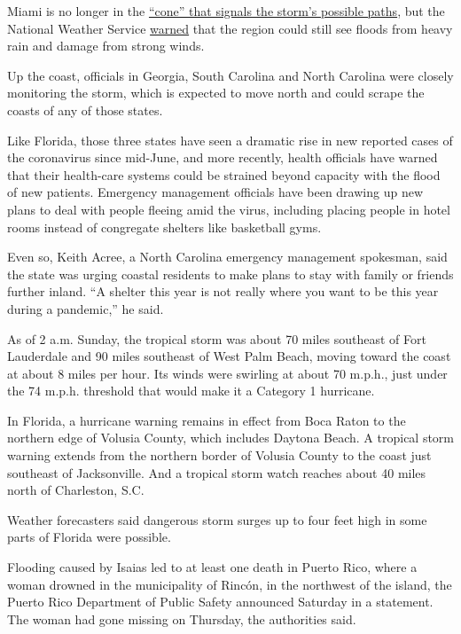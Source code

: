 Miami is no longer in the
\href{https://www.nytimes.com/2018/09/11/climate/hurricane-evacuation-path-forecasts.html}{``cone''
that signals the storm's possible paths}, but the National Weather
Service
\href{https://forecast.weather.gov/showsigwx.php?warnzone=FLZ073\&warncounty=FLC086\&firewxzone=FLZ073\&local_place1=3\%20Miles\%20W\%20Palm\%20Springs\%20North\%20FL\&product1=Hurricane+Local+Statement\&lat=25.9366\&lon=-80.3793\#.XyWaz_hKjOQ}{warned}
that the region could still see floods from heavy rain and damage from
strong winds.

Up the coast, officials in Georgia, South Carolina and North Carolina
were closely monitoring the storm, which is expected to move north and
could scrape the coasts of any of those states.

Like Florida, those three states have seen a dramatic rise in new
reported cases of the coronavirus since mid-June, and more recently,
health officials have warned that their health-care systems could be
strained beyond capacity with the flood of new patients. Emergency
management officials have been drawing up new plans to deal with people
fleeing amid the virus, including placing people in hotel rooms instead
of congregate shelters like basketball gyms.

Even so, Keith Acree, a North Carolina emergency management spokesman,
said the state was urging coastal residents to make plans to stay with
family or friends further inland. ``A shelter this year is not really
where you want to be this year during a pandemic,'' he said.

As of 2 a.m. Sunday, the tropical storm was about 70 miles southeast of
Fort Lauderdale and 90 miles southeast of West Palm Beach, moving toward
the coast at about 8 miles per hour. Its winds were swirling at about 70
m.p.h., just under the 74 m.p.h. threshold that would make it a Category
1 hurricane.

In Florida, a hurricane warning remains in effect from Boca Raton to the
northern edge of Volusia County, which includes Daytona Beach. A
tropical storm warning extends from the northern border of Volusia
County to the coast just southeast of Jacksonville. And a tropical storm
watch reaches about 40 miles north of Charleston, S.C.

Weather forecasters said dangerous storm surges up to four feet high in
some parts of Florida were possible.

Flooding caused by Isaias led to at least one death in Puerto Rico,
where a woman drowned in the municipality of Rincón, in the northwest of
the island, the Puerto Rico Department of Public Safety announced
Saturday in a statement. The woman had gone missing on Thursday, the
authorities said.

